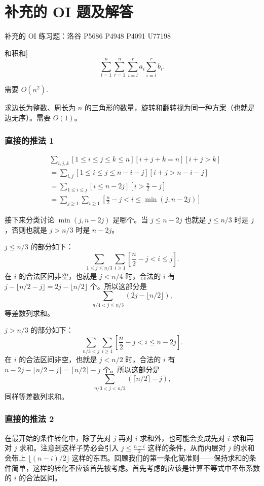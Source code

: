\section{补充的 OI 题及解答}
    补充的 OI 练习题：洛谷 P5686 P4948 P4091 U77198

    \begin{example}[[CSP-S 2019 江西] 和积和]
        $$
        \sum_{l=1}^n\sum_{r=1}^n\sum_{i=l}^ra_i\sum_{i=l}^r b_i.
        $$

        需要 $O(n^2)$.
    \end{example}

    \begin{example}[三角形]
        求边长为整数、周长为 $n$ 的三角形的数量，旋转和翻转视为同一种方案（也就是边无序）。需要 $O(1)$。
    \end{example}


    \subsubsection*{直接的推法 1}
    $$
    \begin{aligned}
        &\sum_{i,j,k}[1\le i\le j\le k\le n][i+j+k=n][i+j>k]\\
        &=\sum_{i,j}[1\le i\le j\le n-i-j][i+j>n-i-j]\\
        &=\sum_{1\le i\le j}[i\le n-2j][i>\frac{n}{2}-j]\\
        &=\sum_{j\ge 1}\sum_{i\ge 1}[\frac{n}{2}-j<i\le \min(j,n-2j)]
    \end{aligned}
    $$

    接下来分类讨论 $\min(j,n-2j)$ 是哪个。当 $j\le n-2j$ 也就是 $j\le n/3$ 时是 $j$，否则也就是 $j>n/3$ 时是 $n-2j$。
    
    $j\le n/3$ 的部分如下：
    $$
    \sum_{1\le j\le n/3}\sum_{i\ge 1}[\frac{n}{2}-j<i\le j].
    $$
    在 $i$ 的合法区间非空，也就是 $j<n/4$ 时，合法的 $i$ 有 $j-\lfloor n/2-j\rfloor=2j-\lfloor n/2\rfloor$ 个。所以这部分是
    $$
    \sum_{n/4<j\le n/3}(2j-\lfloor n/2\rfloor),
    $$
    等差数列求和。
    
    $j>n/3$ 的部分如下：
    $$
    \sum_{n/3<j}\sum_{i\ge 1}[\frac{n}{2}-j<i\le n-2j].
    $$
    在 $i$ 的合法区间非空，也就是 $j<n/2$ 时，合法的 $i$ 有 $n-2j-\lfloor n/2-j\rfloor=\lceil n/2\rceil-j$ 个。所以这部分是
    $$
    \sum_{n/3<j<n/2}(\lceil n/2\rceil-j),
    $$
    同样等差数列求和。

\subsubsection*{直接的推法 2}
    在最开始的条件转化中，除了先对 $j$ 再对 $i$ 求和外，也可能会变成先对 $i$ 求和再对 $j$ 求和。注意到这样子势必会引入 $j\le\frac{n-i}{2}$ 这样的条件，从而内层对 $j$ 的求和会带上 $\lfloor (n-i)/2\rfloor$ 这样的东西。回顾我们的第一条化简准则——保持求和的条件简单，这样的转化不应该首先被考虑。首先考虑的应该是计算不等式中不带系数的 $i$ 的合法区间。
    
